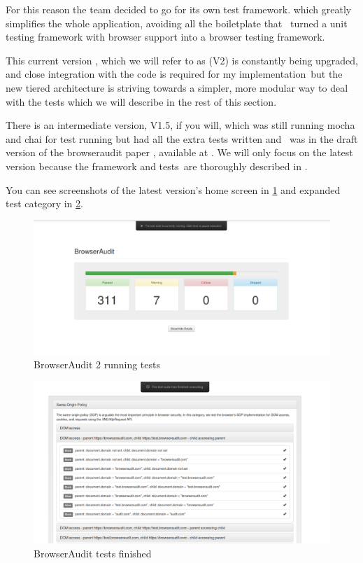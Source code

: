 For this reason the team decided to go for its own test framework. which greatly simplifies the whole application, avoiding all the boiletplate that \
turned a unit testing framework with browser support into a browser testing framework.

This current version , which we will refer to as (V2) is constantly being upgraded, and close integration with the code is required for my implementation\
but the new tiered architecture is striving towards a simpler, more modular way to deal with the tests which we will describe in the rest of this section. 

There is an intermediate version, V1.5, if you will, which was still running mocha and chai for test running but had all the extra tests written and \
was in the draft version of the browseraudit paper , available at \cite{maffeis}. We will only focus on the latest version because the framework and tests\
are thoroughly described in \cite{charlie}.

You can see screenshots of the latest version's home screen in \ref{fig:mainscreen} and expanded test category in \ref{fig:testresult}.


\begin{figure}
\centering
\includegraphics[width=1\textwidth]{./browser20.png}
\caption{\label{fig:mainscreen}BrowserAudit 2 running tests}
\end{figure}

\begin{figure}
\centering
\includegraphics[width=1\textwidth]{./browsertest.png}
\caption{\label{fig:testresult}BrowserAudit tests finished}
\end{figure}

